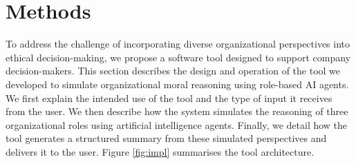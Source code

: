 \section{Methods}
\label{sec:methods}

To address the challenge of incorporating diverse organizational perspectives into ethical decision-making, we propose a software tool designed to support company decision-makers.
This section describes the design and operation of the tool we developed to simulate organizational moral reasoning using role-based AI agents.
We first explain the intended use of the tool and the type of input it receives from the user. We then describe how the system simulates the reasoning of three organizational roles using artificial intelligence agents. Finally, we detail how the tool generates a structured summary from these simulated perspectives and delivers it to the user.
Figure \ref{fig:impl} summarises the tool architecture.

